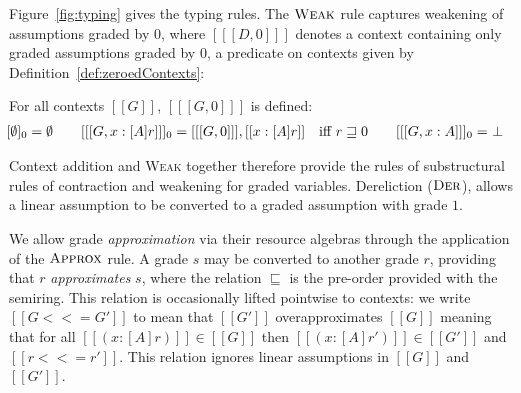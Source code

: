 Figure~\ref{fig:typing} gives the typing rules. The $\textsc{Weak}$ rule
captures weakening of assumptions graded by $0$, where $[[ [ D , 0 ] ]]$ denotes
a context containing only graded assumptions graded by $0$, a predicate on
contexts given by Definition~\ref{def:zeroedContexts}: 
\begin{definition}
  \label{def:zeroedContexts}
  For all contexts $[[ G ]]$, $ [[ [ G, 0 ] ]]$ is defined:
\begin{align*}
    \hspace{-0.9em}
    [ \emptyset ]_0 = \emptyset
    \qquad
    [[ [ {G, x : [A] r} ] ]]_0 = [[ [ G, 0 ] ]], [[ {x : [ A ] r} ]] \quad \text{iff}\ r \sqsupseteq 0
    \qquad
   [[ [ G, x : A ] ]]_0 =\ \perp
\end{align*}
\end{definition}

Context addition and \textsc{Weak} together therefore provide the rules of
substructural rules of contraction and weakening for graded variables.
Dereliction ($\textsc{Der}$), allows a linear assumption to be converted to a
graded assumption with grade $1$. 

We allow grade \textit{approximation} via their resource algebras through the
application of the $\textsc{Approx}$ rule. A grade $s$ may be converted to
another grade $r$, providing that $r$ \textit{approximates} $s$, where the
relation $\sqsubseteq$ is the pre-order provided with the semiring. This
relation is occasionally lifted pointwise to contexts: we write $[[ G <<= G' ]]$
to mean that $[[ G' ]]$ overapproximates $[[ G ]]$ meaning that for all $[[ (x :
[A] r) ]] \in [[ G ]]$ then $[[ (x : [A] r') ]] \in [[ G' ]]$ and $[[ r <<= r'
]]$. This relation ignores linear assumptions in $[[G]]$ and $[[G']]$.

